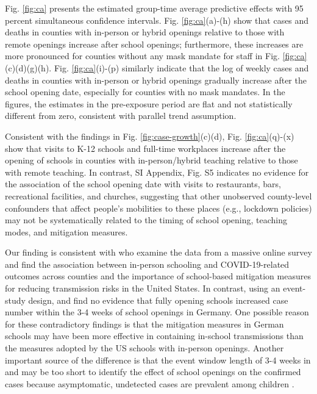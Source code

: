 \documentclass[9pt,twocolumn,twoside,lineno]{pnas-new}
\begin{document}
Fig. \ref{fig:ca} presents the estimated group-time average predictive effects with 95 percent simultaneous confidence intervals.  Fig.  \ref{fig:ca}(a)-(h) show that  cases and deaths in counties with in-person or hybrid openings relative to those with remote openings increase after school openings; furthermore, these increases are more pronounced for counties without any mask mandate for staff in Fig.  \ref{fig:ca}(c)(d)(g)(h). Fig. \ref{fig:ca}(i)-(p) similarly indicate that the log of weekly cases and deaths in counties with in-person or hybrid openings gradually increase after the school opening date, especially for counties with no mask mandates. In the figures, the estimates in the pre-exposure period are flat and not statistically different from zero, consistent with parallel trend assumption.

Consistent with the findings in Fig. \ref{fig:case-growth}(c)(d),    Fig. \ref{fig:ca}(q)-(x) show that visits to K-12 schools and full-time workplaces increase after the opening of schools in counties with in-person/hybrid teaching relative to those with remote teaching. In contrast, SI Appendix, Fig. S5 indicates no evidence for the association of the school opening date with visits to restaurants, bars, recreational facilities, and churches, suggesting that other unobserved county-level confounders that affect people's mobilities to these places (e.g., lockdown policies) may not be systematically related to the timing of school opening, teaching modes, and mitigation measures.

Our finding is consistent with  \cite{Lessler2021} who examine the data from a massive online survey and find the association between in-person schooling and COVID-19-related outcomes across counties and the importance of school-based mitigation measures for reducing transmission risks in the United States.  In contrast, using an event-study design, \cite{ISPHORDING2021} and \cite{Bismarck-Osten2020} find no evidence that fully opening schools increased case number within the 3-4 weeks of school openings in Germany.  One possible reason for these contradictory findings is that the mitigation measures in German
schools may have been more effective in containing in-school transmissions than the measures adopted by the US schools with in-person openings. Another important source of the difference is that the event window length of  3-4 weeks in \cite{ISPHORDING2021} and \cite{Bismarck-Osten2020} may be too short to identify the effect of school openings on the confirmed cases because asymptomatic, undetected cases are prevalent among children \citep{Leidman2021}. 
 
\end{document}

